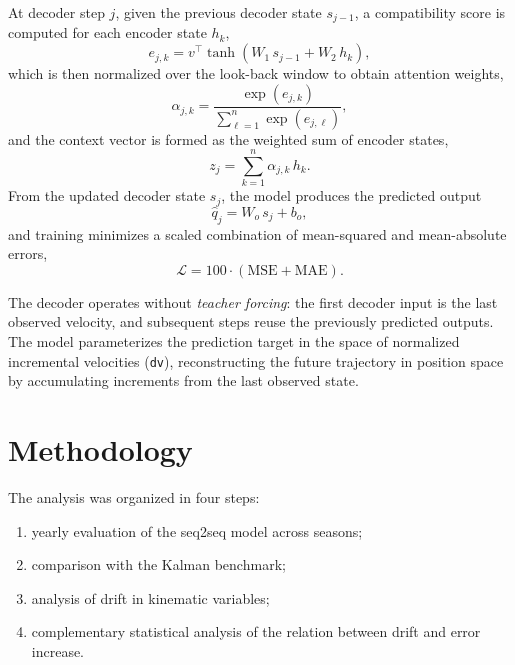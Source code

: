 \documentclass[runningheads]{llncs}
\begin{document}
At decoder step \(j\), given the previous decoder state \(s_{j-1}\), a compatibility score is computed for each encoder state \(h_k\),
\begin{equation}\label{eq:attn_score}
e_{j,k} = v^{\top} \tanh(W_1\, s_{j-1} + W_2\, h_k),
\end{equation}
which is then normalized over the look-back window to obtain attention weights,
\begin{equation}\label{eq:attn_alpha}
\alpha_{j,k} = \frac{\exp(e_{j,k})}{\sum_{\ell=1}^{n} \exp(e_{j,\ell})},
\end{equation}
and the context vector is formed as the weighted sum of encoder states,
\begin{equation}\label{eq:attn_ctx}
z_j = \sum_{k=1}^{n} \alpha_{j,k}\, h_k.
\end{equation}
From the updated decoder state \(s_j\), the model produces the predicted output
\begin{equation}\label{eq:dec_out}
\hat{q}_j = W_o\, s_j + b_o,
\end{equation}
and training minimizes a scaled combination of mean-squared and mean-absolute errors,
\begin{equation}\label{eq:loss}
\mathcal{L} = 100 \cdot (\mathrm{MSE} + \mathrm{MAE}).
\end{equation}

The decoder operates without \textit{teacher forcing}: the first decoder input is the last observed velocity, and subsequent steps reuse the previously predicted outputs. The model parameterizes the prediction target in the space of normalized incremental velocities (\texttt{dv}), reconstructing the future trajectory in position space by accumulating increments from the last observed state.

\section{Methodology}

The analysis was organized in four steps:

\begin{enumerate}
    \item yearly evaluation of the seq2seq model across seasons;
    \item comparison with the Kalman benchmark;
    \item analysis of drift in kinematic variables;
    \item complementary statistical analysis of the relation between drift and error increase.
\end{enumerate}
\end{document}
